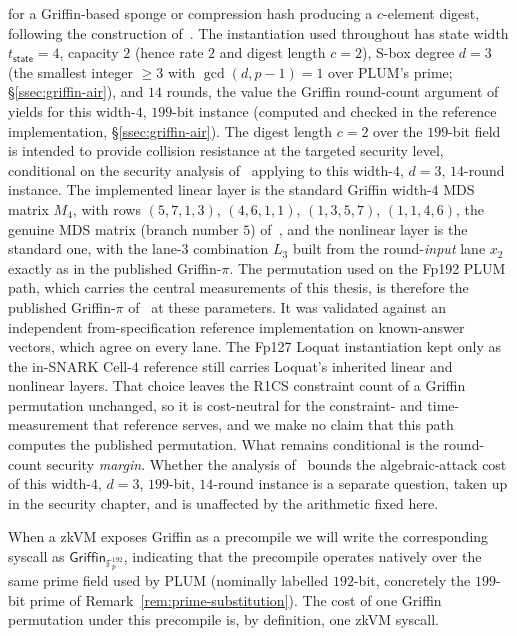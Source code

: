 for a Griffin-based sponge or compression hash producing a $c$-element digest, following the construction of~\cite{cryptoeprint:2022/403}. The instantiation used throughout has state width $t_{\mathsf{state}}=4$, capacity $2$ (hence rate $2$ and digest length $c=2$), S-box degree $d=3$ (the smallest integer $\ge 3$ with $\gcd(d,p-1)=1$ over PLUM's prime; \S\ref{ssec:griffin-air}), and $14$ rounds, the value the Griffin round-count argument of~\cite{cryptoeprint:2022/403} yields for this width-$4$, $199$-bit instance (computed and checked in the reference implementation, \S\ref{ssec:griffin-air}). The digest length $c=2$ over the $199$-bit field is intended to provide collision resistance at the targeted security level, conditional on the security analysis of~\cite{cryptoeprint:2022/403} applying to this width-$4$, $d=3$, $14$-round instance. The implemented linear layer is the standard Griffin width-$4$ MDS matrix $M_4$, with rows $(5,7,1,3)$, $(4,6,1,1)$, $(1,3,5,7)$, $(1,1,4,6)$, the genuine MDS matrix (branch number $5$) of~\cite{cryptoeprint:2022/403}, and the nonlinear layer is the standard one, with the lane-$3$ combination $L_3$ built from the round-\emph{input} lane $x_2$ exactly as in the published Griffin-$\pi$. The permutation used on the Fp192 PLUM path, which carries the central measurements of this thesis, is therefore the published Griffin-$\pi$ of~\cite{cryptoeprint:2022/403} at these parameters. It was validated against an independent from-specification reference implementation on known-answer vectors, which agree on every lane. The Fp127 Loquat instantiation kept only as the in-SNARK Cell-$4$ reference still carries Loquat's inherited linear and nonlinear layers. That choice leaves the R1CS constraint count of a Griffin permutation unchanged, so it is cost-neutral for the constraint- and time-measurement that reference serves, and we make no claim that this path computes the published permutation. What remains conditional is the round-count security \emph{margin}. Whether the analysis of~\cite{cryptoeprint:2022/403} bounds the algebraic-attack cost of this width-$4$, $d=3$, $199$-bit, $14$-round instance is a separate question, taken up in the security chapter, and is unaffected by the arithmetic fixed here.

When a zkVM exposes Griffin as a precompile we will write the corresponding syscall as $\mathsf{Griffin}_{\mathbb{F}_p^{192}}$, indicating that the precompile operates natively over the same prime field used by PLUM (nominally labelled $192$-bit, concretely the $199$-bit prime of Remark~\ref{rem:prime-substitution}). The cost of one Griffin permutation under this precompile is, by definition, one zkVM syscall.

